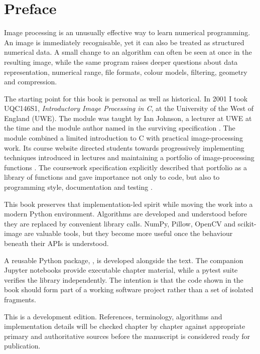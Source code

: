 \chapter*{Preface}

Image processing is an unusually effective way to learn numerical programming.
An image is immediately recognisable, yet it can also be treated as structured
numerical data. A small change to an algorithm can often be seen at once in the
resulting image, while the same program raises deeper questions about data
representation, numerical range, file formats, colour models, filtering,
geometry and compression.

The starting point for this book is personal as well as historical. In 2001 I
took UQC146S1, \emph{Introductory Image Processing in C}, at the University of
the West of England (UWE). The module was taught by Ian Johnson, a lecturer at
UWE at the time and the module author named in the surviving specification
\cite{uwe_uqc146_spec}. The module combined a limited introduction to C with
practical image-processing work\cite{johnson_uqc146_intro}. Its course website
directed students towards progressively implementing techniques introduced in
lectures and maintaining a portfolio of image-processing functions
\cite{johnson_uqc146_web}. The coursework specification explicitly described
that portfolio as a library of functions and gave importance not only to code,
but also to programming style, documentation and testing
\cite{johnson_uqc146_assignment}.

This book preserves that implementation-led spirit while moving the work into a
modern Python environment. Algorithms are developed and understood before they
are replaced by convenient library calls. NumPy, Pillow, OpenCV and
scikit-image are valuable tools, but they become more useful once the behaviour
beneath their APIs is understood.

A reusable Python package, \pyimage{}, is developed alongside the text. The
companion Jupyter notebooks provide executable chapter material, while a pytest
suite verifies the library independently. The intention is that the code shown
in the book should form part of a working software project rather than a set of
isolated fragments.

This is a development edition. References, terminology, algorithms and
implementation details will be checked chapter by chapter against appropriate
primary and authoritative sources before the manuscript is considered ready for
publication.
